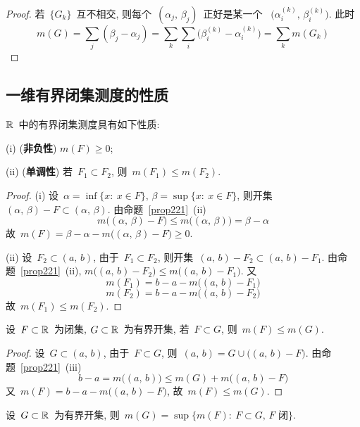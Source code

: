 \begin{proof}
若~$\{G_k\}$~互不相交, 则每个~$(\alpha_j,\,\beta_j)$~正好是某一个
~$\big(\alpha^{(k)}_i,\, \beta^{(k)}_i \big)$. 此时
\[
m(G) = \sum_j(\beta_j - \alpha_j) = \sum_k \sum_i \big(\beta^{(k)}_i
- \alpha^{(k)}_i \big) = \sum_k m(G_k)
\]
\end{proof}

\subsection{一维有界闭集测度的性质}

\begin{proposition} \label{prop222}
$\mathbb{R}$~中的有界闭集测度具有如下性质:

(i) (\textbf{非负性}) $m(F) \geqslant 0$;

(ii) (\textbf{单调性}) 若~$F_1 \subset F_2$, 则~$m(F_1) \leqslant m(F_2)$.
\end{proposition}

\begin{proof}
(i) 设~$\alpha = \inf\{x: \: x\in F\},\,\beta = \sup\{x: \: x\in F\}$,
则开集~$(\alpha,\,\beta) - F \subset (\alpha,\,\beta)$. 由命题~\ref{prop221}~(ii)
\[
m\big( (\alpha,\,\beta) - F \big) \leqslant m\big( (\alpha,\,\beta) \big) = \beta - \alpha
\]
故~$m(F) = \beta - \alpha - m\big( (\alpha,\,\beta) - F \big) \geqslant 0$.

(ii) 设~$F_2 \subset (a,\,b)$, 由于~$F_1 \subset F_2$, 则开集~$(a,\,b) - F_2 \subset
(a,\,b) - F_1$. 由命题~\ref{prop221}~(ii), $m\big( (a,\,b) - F_2 \big) \leqslant
m\big( (a,\,b) - F_1 \big)$. 又
\[
m(F_1) = b-a - m\big( (a,\,b) - F_1 \big)
\]
\[
m(F_2) = b-a - m\big( (a,\,b) - F_2 \big)
\]
故~$m(F_1) \leqslant m(F_2)$.
\end{proof}

\begin{lemma} \label{lem223}
设~$F \subset \mathbb{R}$~为闭集, $G \subset \mathbb{R}$~为有界开集,
若~$F \subset G$, 则~$m(F) \leqslant m(G)$.
\end{lemma}

\begin{proof}
设~$G \subset (a,\,b)$, 由于~$F \subset G$, 则~$(a,\,b) = G \cup
\big( (a,\,b) - F \big)$. 由命题~\ref{prop221}~(iii)
\[
b - a = m\big((a,\,b)\big) \leqslant m(G) + m\big( (a,\,b) - F \big)
\]
又~$m(F) = b - a - m\big( (a,\,b) - F \big)$, 故~$m(F) \leqslant m(G)$.
\end{proof}

\begin{theorem} \label{thm221}
设~$G \subset \mathbb{R}$~为有界开集, 则~$m(G) = \sup\big\{m(F): \: F \subset G,\,
F \mbox{~闭}\big\}$.
\end{theorem}

